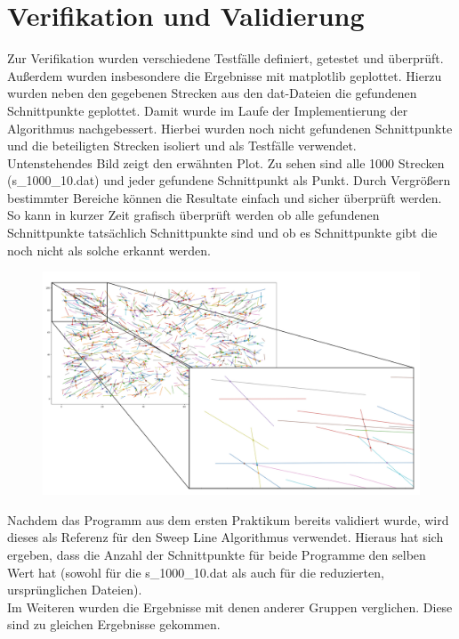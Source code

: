 \documentclass[12pt]{scrartcl}
\begin{document}
\section{Verifikation und Validierung}

Zur Verifikation wurden verschiedene Testfälle definiert, getestet und überprüft.
Außerdem wurden insbesondere die Ergebnisse mit matplotlib geplottet.
Hierzu wurden neben den gegebenen Strecken aus den dat-Dateien die gefundenen Schnittpunkte geplottet.
Damit wurde im Laufe der Implementierung der Algorithmus nachgebessert.
Hierbei wurden noch nicht gefundenen Schnittpunkte und die beteiligten Strecken isoliert und als Testfälle verwendet.\\
Untenstehendes Bild zeigt den erwähnten Plot. Zu sehen sind alle 1000 Strecken (s\_1000\_10.dat) und jeder gefundene Schnittpunkt als Punkt.
Durch Vergrößern bestimmter Bereiche können die Resultate einfach und sicher überprüft werden. 
So kann in kurzer Zeit grafisch überprüft werden ob alle gefundenen Schnittpunkte tatsächlich Schnittpunkte sind und 
ob es Schnittpunkte gibt die noch nicht als solche erkannt werden.\\


\begin{figure}[ht]
    \centering
    \includegraphics[scale=0.25]{Plot_zoom_and_all.jpeg}
\end{figure}

Nachdem das Programm aus dem ersten Praktikum bereits validiert wurde, wird dieses als Referenz für den Sweep Line Algorithmus verwendet. Hieraus hat sich ergeben, dass die Anzahl der Schnittpunkte für beide Programme den selben Wert hat (sowohl für die s\_1000\_10.dat als auch für die reduzierten, ursprünglichen Dateien).\\
Im Weiteren wurden die Ergebnisse mit denen anderer Gruppen verglichen. Diese sind zu gleichen Ergebnisse gekommen.

\end{document}
